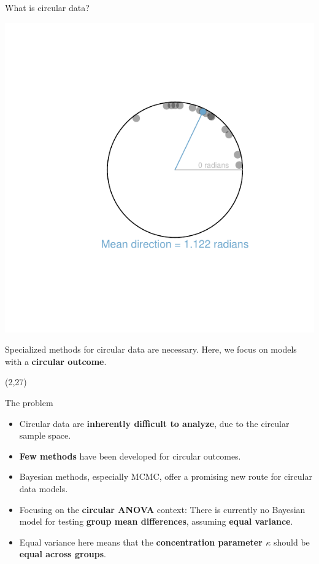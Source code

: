 \documentclass[final]{beamer}
\begin{document}
\begin{frame}
\begin{textblock}{55}
\begin{block}{\centering What is circular data?}
\begin{minipage}{0.20\textwidth}
\includegraphics[width=\textwidth, trim = 2.8cm 2.5cm 2.1cm 2.6cm, clip]{Exampledataset2.pdf}
\end{minipage}
\vspace{1cm}

Specialized methods for circular data are necessary. Here, we focus on models with a \textbf{circular outcome}.

\end{block}
%
\end{textblock}
\begin{textblock}{26.5}(2,27)
%
\vspace{\TPHorizModule}

\begin{block}{The problem}

\begin{itemize}
\item Circular data are \textbf{inherently difficult to analyze}, due to the circular sample space.
\item \textbf{Few methods} have been developed for circular outcomes.
\item Bayesian methods, especially MCMC, offer a promising new route for circular data models. 
\item Focusing on the \textbf{circular ANOVA} context: \textcolor{keesred}{There is currently no Bayesian model for testing \textbf{group mean differences}, assuming \textbf{equal variance}.}
\item Equal variance here means that the \textbf{concentration parameter $\kappa$} should be \textbf{equal across groups}.
\end{itemize}
\end{block}


\end{textblock}
\end{frame}
\end{document}
